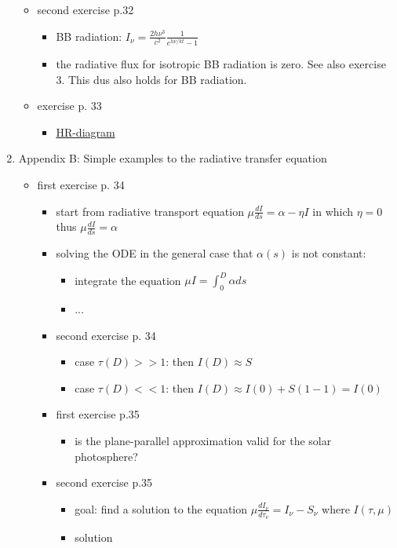\documentclass[10pt,a4paper]{article}
\begin{document}
\begin{enumerate}
\begin{itemize}
\item second exercise p.32
\begin{itemize}
\item BB radiation: $I_{\nu} = \frac{2h \nu^3}{c^2} \frac{1}{e^{h \nu/kt}-1}$
\item the radiative flux for isotropic BB radiation is zero. See also exercise 3. This dus also holds for BB radiation.
\end{itemize}

\item exercise p. 33
\begin{itemize}
\item \underline{HR-diagram}
\end{itemize}

\end{itemize}

\item Appendix B: Simple examples to the radiative transfer equation
\begin{itemize}

\item first exercise p. 34
\begin{itemize}
\item start from radiative transport equation $\mu \frac{dI}{ds} = \alpha - \eta I$ in which $\eta = 0$ thus $\boxed{\mu \frac{dI}{ds} = \alpha}$
\item solving the ODE in the general case that $\alpha(s)$ is not constant: 
\begin{itemize}
\item integrate the equation $\mu I = \int_0^D \alpha ds$
\item ...
\end{itemize}
 
\item second exercise p. 34
\begin{itemize}
\item case $\tau(D) >> 1$: then $I(D) \approx S$ 
\item case $\tau(D) << 1$: then $I(D) \approx I(0)+S(1-1) = I(0)$
\end{itemize} 
 
\item first exercise p.35
\begin{itemize}
\item is the plane-parallel approximation valid for the solar photosphere?
\end{itemize} 

\item second exercise p.35
\begin{itemize}
\item goal: find a solution to the equation $\mu \frac{dI_{\nu}}{d\tau_{\nu}} = I_{\nu} - S_{\nu}$ where $I(\tau,\mu)$
\item solution
\end{itemize}
 

\end{itemize}
\end{itemize}
\end{enumerate}
\end{document}
